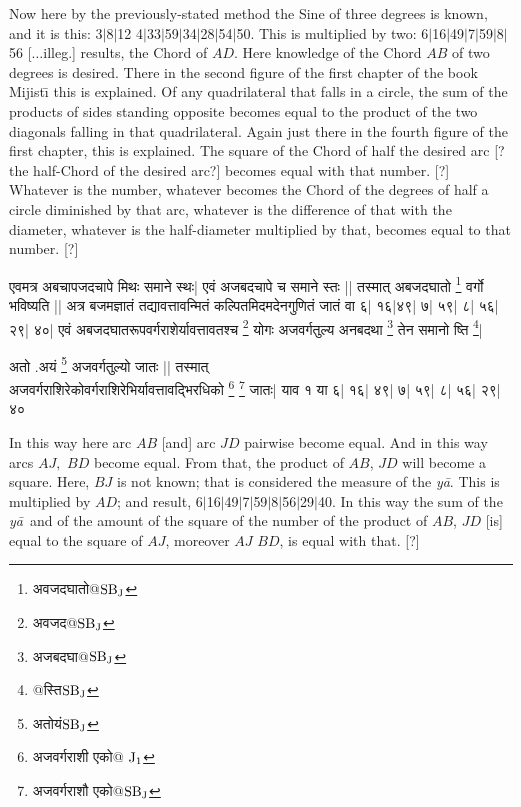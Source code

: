 \documentclass[11pt,a5paper]{book}
\def\elp{$\ldots\,$}
\def\ya{\textit{y\=a}}
\def\elp{$\ldots$}
\def\danda{$|$}
\begin{document}
Now here by the previously-stated method the Sine of three degrees is known, and it 
is this: 3\danda 8\danda 12 4\danda 33\danda 59\danda 34\danda 28\danda 54\danda 50.
This is multiplied by two: 6\danda 16\danda 49\danda 7\danda 59\danda 8\danda 56
[\elp illeg.] results, the Chord of $AD$. Here knowledge of the Chord $AB$ of two degrees
is desired. There in the second figure of the first chapter of the book Mijist\={\i} this
is explained. Of any quadrilateral that falls in a circle, the
sum of the products of sides standing opposite 
becomes equal to the product of the two diagonals falling in that quadrilateral.
Again just there in the fourth figure of the first chapter, this is explained. The square
of the Chord of half the desired arc [? the half-Chord of the desired
arc?] becomes equal with that number. [?] Whatever is the number, whatever becomes
the Chord of the degrees of half a circle diminished by that arc, whatever is the difference 
of that with the diameter, whatever is the half-diameter multiplied by that, becomes 
equal to that number. [?] 

\newpage
{\s एवमत्र अबचापजदचापे मिथः समाने स्थः|
एवं अजबदचापे च समाने स्तः ||
तस्मात् अबजदघातो \footnote{{\s अवजदघातो@}${\rm SB_J}$} वर्गो भविष्यति ||
अत्र बजमज्ञातं तद्यावत्तावन्मितं कल्पितमिदमदेनगुणितं
जातं वा ६| १६|४९| ७| ५९| ८| ५६| २९| ४०|
एवं अबजदघातरूपवर्गराशेर्यावत्तावतश्च \footnote{{\s अवजद@}${\rm SB_J}$} योगः
अजवर्गतुल्य अनबदथा \footnote{{\s अजबदघा@}${\rm SB_J}$} तेन समानो ष्ति \footnote{{\s @स्ति}${\rm SB_J}$}|

अतो .अयं \footnote{{\s अतोयं}${\rm SB_J}$} अजवर्गतुल्यो जातः ||
तस्मात् \\
अजवर्गराशिरेकोवर्गराशिरेभिर्यावत्तावद्भिरधिको
\footnote{{\s अजवर्गराशी एको@ }${\rm J_1}$}
\footnote{{\s अजवर्गराशौ एको@}${\rm SB_J}$}
जातः|
याव १ या ६| १६| ४९| ७| ५९| ८| ५६| २९| ४०}


\newpage
In this way here arc $AB$ [and] arc $JD$ pairwise become equal. 
And in this way arcs $AJ,$  $BD$ become equal.
From that, the product of $AB$, $JD$ will become a square. Here, $BJ$ is not known;
that is considered the measure of the \ya. This is multiplied by $AD$; and result,
6\danda 16\danda 49\danda 7\danda 59\danda 8\danda 56\danda 29\danda 40.
In this way the sum of the \ya\
and of the amount of the square of the number of the product of $AB$, $JD$
[is] equal to the square of $AJ$, moreover $AJ$ $BD$, is equal with that. [?]

\end{document}
